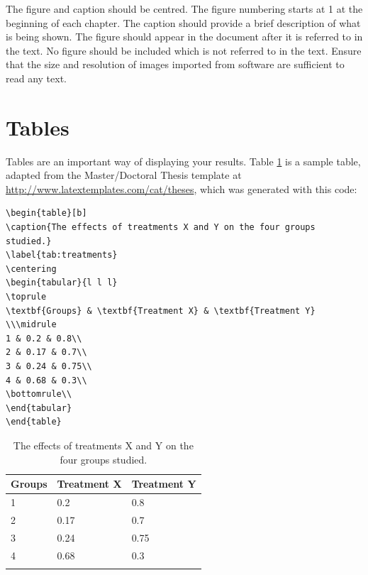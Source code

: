 The figure and caption should be centred. The figure numbering starts at 1 at the beginning of each chapter. The caption should provide a brief description of what is being shown. The figure should appear in the document after it is referred to in the text. No figure should be included which is not referred to in the text. Ensure that the size and resolution of images imported from software are sufficient to read any text.

\section{Tables}
Tables are an important way of displaying your results. Table \ref{tab:treatments} is a sample table, adapted from the Master/Doctoral Thesis template at \url{http://www.latextemplates.com/cat/theses}, which was generated with this code:

{\footnotesize
\begin{verbatim}
\begin{table}[b]
\caption{The effects of treatments X and Y on the four groups studied.}
\label{tab:treatments}
\centering
\begin{tabular}{l l l}
\toprule
\textbf{Groups} & \textbf{Treatment X} & \textbf{Treatment Y} \\\midrule
1 & 0.2 & 0.8\\
2 & 0.17 & 0.7\\
3 & 0.24 & 0.75\\
4 & 0.68 & 0.3\\
\bottomrule\\
\end{tabular}
\end{table}
\end{verbatim}
}

\begin{table}[b]
\caption{The effects of treatments X and Y on the four groups studied.}
\label{tab:treatments}
\centering
\begin{tabular}{l l l}
\toprule
\textbf{Groups} & \textbf{Treatment X} & \textbf{Treatment Y} \\
\midrule
1 & 0.2 & 0.8\\
2 & 0.17 & 0.7\\
3 & 0.24 & 0.75\\
4 & 0.68 & 0.3\\
\bottomrule\\
\end{tabular}
\end{table}

